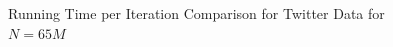 \documentclass[12pt,notitlepage,oneside]{report}
\begin{document}
\begin{figure}[!htbp]
    \centering
    \caption{Running Time per Iteration Comparison for Twitter Data for $N = 65M$}
    \label{comp:D1}
\end{figure}

\newpage
\end{document}
